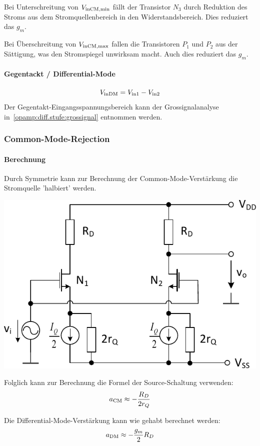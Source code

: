 \smallskip

Bei Unterschreitung von $V_{\rm inCM, min}$ fällt der Transistor $N_3$ durch Reduktion des Stroms aus dem Stromquellenbereich in den Widerstandsbereich. Dies reduziert das $g_m$.

Bei Überschreitung von $V_{\rm inCM, max}$ fallen die Transistoren $P_1$ und $P_2$ aus der Sättigung, was den Stromspiegel unwirksam macht. Auch dies reduziert das $g_m$.


\paragraph{Gegentackt / Differential-Mode}
\[
    V_{\rm inDM} = V_{\rm in1} - V_{\rm in2}
\]
Der Gegentakt-Eingangsspannungsbereich kann der Grossignalanalyse in~\ref{opamp:diff.stufe:grossignal} entnommen werden.


\subsubsection{Common-Mode-Rejection}
\paragraph{Berechnung}

Durch Symmetrie kann zur Berechnung der Common-Mode-Verstärkung die Stromquelle 'halbiert' werden.

\begin{minipage}[t]{0.48\columnwidth}
    \includegraphics[width=\columnwidth, align=t]{images/09_common_mode_rejection.pdf}
\end{minipage}
\hfill
\begin{minipage}[t]{0.48\columnwidth}
    Folglich kann zur Berechnung die Formel der Source-Schaltung verwenden:
    \[
        a_{\rm CM} \approx - \frac{R_D}{2 r_Q}    %
    \]

    Die Differential-Mode-Verstärkung kann wie gehabt berechnet werden:
    \[
        a_{\rm DM} \approx -\frac{g_m}{2} R_D
\]
\end{minipage}



